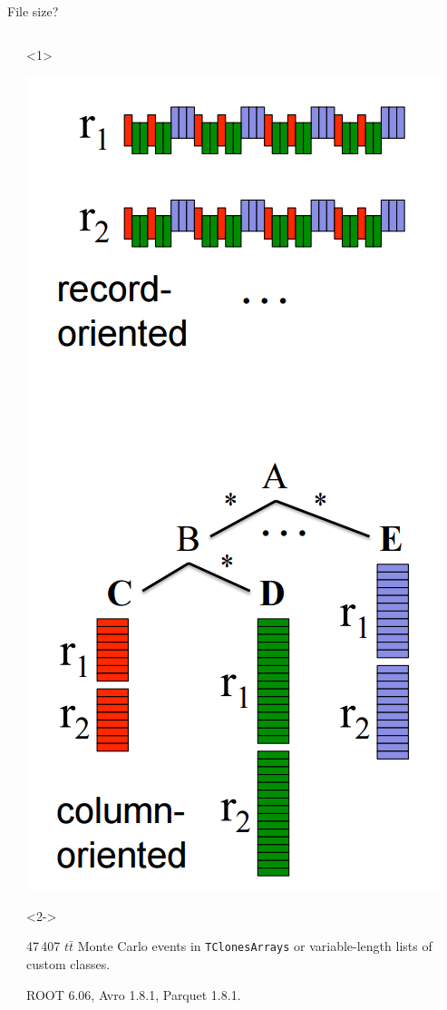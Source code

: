 \documentclass{beamer}
\begin{document}
\begin{frame}{File size?}
\begin{columns}
\begin{column}{0.55\linewidth}
\begin{itemize}
\end{itemize}
\end{column}
\begin{column}{0.5\linewidth}
\begin{onlyenv}<1>
\begin{center}
\includegraphics[width=0.5\linewidth]{columnar.png}
\end{center}
\end{onlyenv}
\begin{onlyenv}<2->
\begin{center}
\begin{minipage}{0.9\linewidth}
\scriptsize 47\,407 $t\bar{t}$ Monte Carlo events in {\tt TClonesArrays} or variable-length lists of custom classes.

\vspace{0.1 cm}
ROOT 6.06, Avro 1.8.1, Parquet 1.8.1.
\end{minipage}


\end{center}
\end{onlyenv}
\end{column}
\end{columns}
\end{frame}
\end{document}
